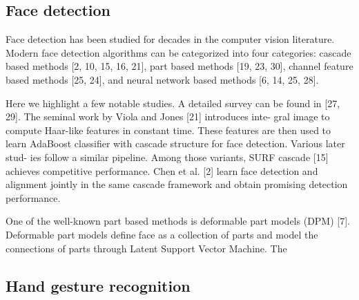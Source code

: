 \subsection{Face detection}
\label{sec:face-detection}
Face detection has been studied for decades in the computer
vision literature. Modern face detection algorithms can
be categorized into four categories:
cascade based methods [2, 10, 15, 16, 21],
part based methods [19, 23, 30], channel feature based methods [25, 24], and
neural network based methods [6, 14, 25, 28].

Here we highlight a few notable studies.
A detailed survey can be found in [27, 29].
The seminal work by Viola and Jones [21] introduces inte-
gral image to compute Haar-like features in constant time.
These features are then used to learn AdaBoost classifier
with cascade structure for face detection. Various later stud-
ies follow a similar pipeline. Among those variants, SURF
cascade [15] achieves competitive performance. Chen et al. [2] learn face
detection and alignment jointly in the same cascade framework and obtain promising detection performance.

One of the well-known part based methods is deformable
part models (DPM) [7]. Deformable part models define
face as a collection of parts and model the connections
of parts through Latent Support Vector Machine. The

\subsection{Hand gesture recognition}
\label{sec:hand-gest-recogn}


